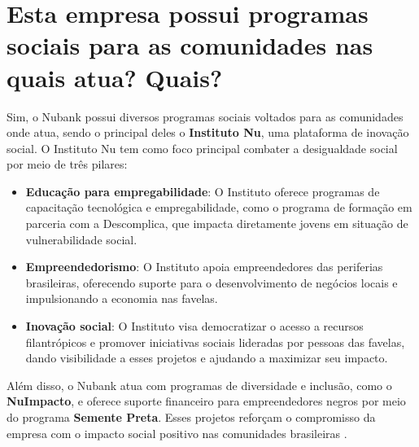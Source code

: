 \section{Esta empresa possui programas sociais para as comunidades nas quais atua? Quais?}

Sim, o Nubank possui diversos programas sociais voltados para as comunidades onde atua, sendo o principal deles o \textbf{Instituto Nu}, uma plataforma de inovação social. O Instituto Nu tem como foco principal combater a desigualdade social por meio de três pilares:

\begin{itemize}
    \item \textbf{Educação para empregabilidade}: O Instituto oferece programas de capacitação tecnológica e empregabilidade, como o programa de formação em parceria com a Descomplica, que impacta diretamente jovens em situação de vulnerabilidade social.
    \item \textbf{Empreendedorismo}: O Instituto apoia empreendedores das periferias brasileiras, oferecendo suporte para o desenvolvimento de negócios locais e impulsionando a economia nas favelas.
    \item \textbf{Inovação social}: O Instituto visa democratizar o acesso a recursos filantrópicos e promover iniciativas sociais lideradas por pessoas das favelas, dando visibilidade a esses projetos e ajudando a maximizar seu impacto.
\end{itemize}

Além disso, o Nubank atua com programas de diversidade e inclusão, como o \textbf{NuImpacto}, e oferece suporte financeiro para empreendedores negros por meio do programa \textbf{Semente Preta}. Esses projetos reforçam o compromisso da empresa com o impacto social positivo nas comunidades brasileiras \cite{nubankinstitutonu2024, nubankcarreiras2024, nubankesg2024}.
